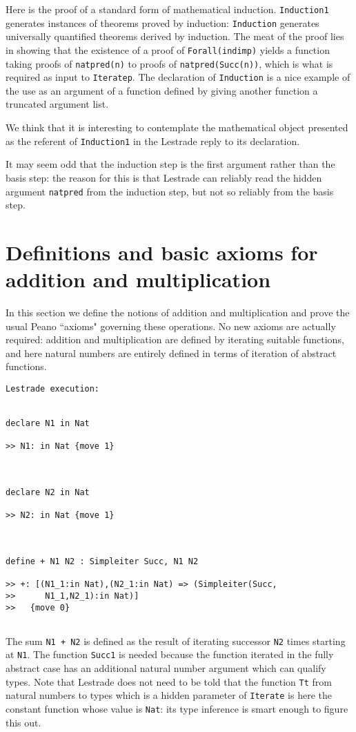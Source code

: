 \documentclass[12pt]{article}
\begin{document}
Here is the proof of a standard form of mathematical induction.   {\tt Induction1} generates instances of theorems proved by induction:  {\tt Induction} generates universally quantified theorems derived by induction.  The meat of the proof lies in showing that the existence of a proof of {\tt Forall(indimp)} yields a function taking proofs of {\tt natpred(n)} to proofs of {\tt natpred(Succ(n))}, which is what is required as input to {\tt Iteratep}.  The declaration of {\tt Induction} is a nice example of the use as an argument of a function defined by giving another function a truncated argument list.

We think that it is interesting to contemplate the mathematical object presented as the referent of {\tt Induction1} in the Lestrade reply to its declaration.

It may seem odd that the induction step is the first argument rather than the basis step:  the reason for this is that Lestrade can reliably read the hidden argument {\tt natpred} from the induction step, but not so reliably from the basis step.

\section{Definitions and basic axioms for addition and multiplication}

In this section we define the notions of addition and multiplication and prove the usual Peano ``axioms" governing these operations.  No new axioms are actually required:  addition and multiplication are defined by iterating suitable functions,
and here natural numbers are entirely defined in terms of iteration of abstract functions.

\begin{verbatim}Lestrade execution:


declare N1 in Nat

>> N1: in Nat {move 1}



declare N2 in Nat

>> N2: in Nat {move 1}



define + N1 N2 : Simpleiter Succ, N1 N2

>> +: [(N1_1:in Nat),(N2_1:in Nat) => (Simpleiter(Succ,
>>      N1_1,N2_1):in Nat)]
>>   {move 0}


\end{verbatim}

The sum {\tt N1 + N2} is defined as the result of iterating successor {\tt N2} times starting at {\tt N1}.  The function {\tt Succ1} is needed because the function iterated in the fully abstract case
has an additional natural number argument which can qualify types.  Note that Lestrade does not need to be told that the function {\tt Tt} from natural numbers to types which is a hidden parameter of {\tt Iterate} is here the constant function whose
value is {\tt Nat}:  its type inference is smart enough to figure this out.
\end{document}
